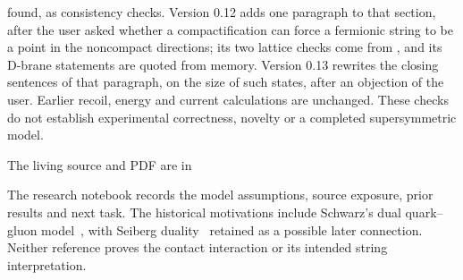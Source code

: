 \documentclass[11pt]{article}
\begin{document}
found, as consistency checks. Version 0.12 adds one paragraph to that section, after the user asked whether a compactification can force a fermionic string to be a point in the noncompact directions; its two lattice checks come from , and its D-brane statements are quoted from memory. Version 0.13 rewrites the closing sentences of that paragraph, on the size of such states, after an objection of the user. Earlier recoil, energy and current calculations are unchanged. These checks do not establish experimental correctness, novelty or a completed supersymmetric model.

The living source and PDF are in
\begin{quote}\small
{}
\end{quote}
The research notebook records the model assumptions, source exposure, prior results and next task. The historical motivations include Schwarz's dual quark--gluon model~\cite{Schwarz}, with Seiberg duality~\cite{Seiberg} retained as a possible later connection. Neither reference proves the contact interaction or its intended string interpretation.
\end{document}
